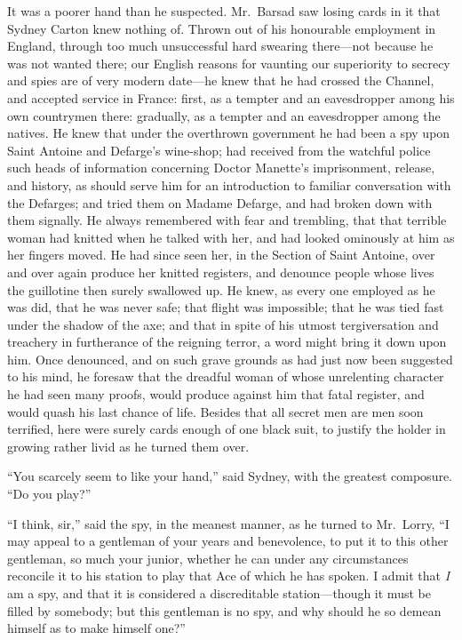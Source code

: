 It was a poorer hand than he suspected.  Mr.\ Barsad saw losing cards
in it that Sydney Carton knew nothing of.  Thrown out of his
honourable employment in England, through too much unsuccessful hard
swearing there---not because he was not wanted there; our English
reasons for vaunting our superiority to secrecy and spies are of very
modern date---he knew that he had crossed the Channel, and accepted
service in France:  first, as a tempter and an eavesdropper among his
own countrymen there:  gradually, as a tempter and an eavesdropper
among the natives.  He knew that under the overthrown government he
had been a spy upon Saint Antoine and Defarge's wine-shop; had
received from the watchful police such heads of information
concerning Doctor Manette's imprisonment, release, and history, as
should serve him for an introduction to familiar conversation with
the Defarges; and tried them on Madame Defarge, and had broken down
with them signally.  He always remembered with fear and trembling,
that that terrible woman had knitted when he talked with her, and had
looked ominously at him as her fingers moved.  He had since seen her,
in the Section of Saint Antoine, over and over again produce her
knitted registers, and denounce people whose lives the guillotine
then surely swallowed up.  He knew, as every one employed as he was
did, that he was never safe; that flight was impossible; that he was
tied fast under the shadow of the axe; and that in spite of his
utmost tergiversation and treachery in furtherance of the reigning
terror, a word might bring it down upon him.  Once denounced, and on
such grave grounds as had just now been suggested to his mind, he
foresaw that the dreadful woman of whose unrelenting character he had
seen many proofs, would produce against him that fatal register, and
would quash his last chance of life.  Besides that all secret men are
men soon terrified, here were surely cards enough of one black suit,
to justify the holder in growing rather livid as he turned them over.

``You scarcely seem to like your hand,'' said Sydney, with the greatest
composure.  ``Do you play?''

``I think, sir,'' said the spy, in the meanest manner, as he turned to
Mr.\ Lorry, ``I may appeal to a gentleman of your years and benevolence,
to put it to this other gentleman, so much your junior, whether he
can under any circumstances reconcile it to his station to play that
Ace of which he has spoken.  I admit that \emph{I} am a spy, and that it
is considered a discreditable station---though it must be filled by
somebody; but this gentleman is no spy, and why should he so demean
himself as to make himself one?''

